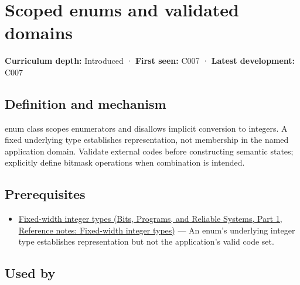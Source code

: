 \hypertarget{appendix-23640fcee147}{}\label{referencestart:appendix-23640fcee147}
\section{Scoped enums and validated domains}\label{appendix-23640fcee147-scoped-enums-and-validated-domains}

\hypertarget{appendix-23640fcee147-scoped-enums-and-validated-domains}{}

\textbf{Curriculum depth:} Introduced · \textbf{First seen:} C007 · \textbf{Latest development:} C007

\begin{allmightroledefinition}

\subsection{Definition and mechanism}\label{appendix-23640fcee147-definition-and-mechanism}

\hypertarget{appendix-23640fcee147-definition-and-mechanism}{}

enum class scopes enumerators and disallows implicit conversion to integers. A fixed underlying type establishes representation, not membership in the named application domain. Validate external codes before constructing semantic states; explicitly define bitmask operations when combination is intended.

\end{allmightroledefinition}

\subsection{Prerequisites}\label{appendix-23640fcee147-prerequisites}

\hypertarget{appendix-23640fcee147-prerequisites}{}

\begin{itemize}
\tightlist
\item
  \href{../01-Bits-Programs-and-Reliable-Systems-P01/main.pdf\#nameddest=appendix-cc04044b5782}{Fixed-width integer types (Bits, Programs, and Reliable Systems, Part 1, Reference notes: Fixed-width integer types)} --- An enum's underlying integer type establishes representation but not the application's valid code set.
\end{itemize}

\subsection{Used by}\label{appendix-23640fcee147-used-by}

